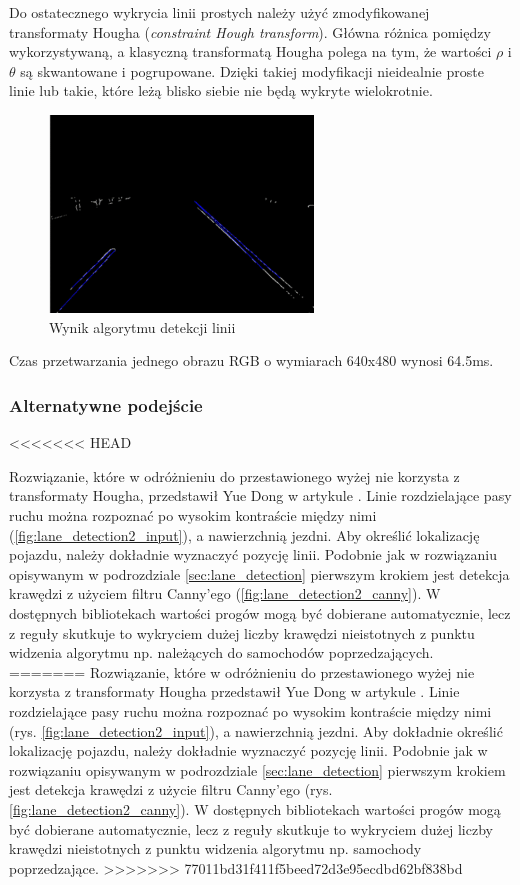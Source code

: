 Do ostatecznego wykrycia linii prostych należy użyć zmodyfikowanej transformaty Hougha (\textit{constraint Hough transform}). 
Główna różnica pomiędzy wykorzystywaną, a klasyczną transformatą Hougha polega na tym, że wartości $\rho$ i $\theta$ są skwantowane i pogrupowane. 
Dzięki takiej modyfikacji nieidealnie proste linie lub takie, które leżą blisko siebie nie będą wykryte wielokrotnie. 

\begin{figure}
  \centering
  \includegraphics[width=7cm]{img/prehough.png}
  \caption{Wynik algorytmu detekcji linii\cite{T3}}
  \label{fig:result}
\end{figure}

Czas przetwarzania jednego obrazu RGB o wymiarach 640x480 wynosi 64.5ms.

\subsubsection{Alternatywne podejście}
<<<<<<< HEAD

Rozwiązanie, które w odróżnieniu do przestawionego wyżej nie korzysta z transformaty Hougha, przedstawił Yue Dong w artykule \cite{T6}.
Linie rozdzielające pasy ruchu można rozpoznać po wysokim kontraście między nimi (\ref{fig:lane_detection2_input}), a nawierzchnią jezdni. 
Aby określić lokalizację pojazdu, należy dokładnie wyznaczyć pozycję linii. 
Podobnie jak w rozwiązaniu opisywanym w podrozdziale \ref{sec:lane_detection} pierwszym krokiem jest detekcja krawędzi z użyciem filtru Canny'ego (\ref{fig:lane_detection2_canny}). 
W dostępnych bibliotekach wartości progów mogą być dobierane automatycznie, lecz z reguły skutkuje to wykryciem dużej liczby krawędzi nieistotnych z punktu widzenia algorytmu np. należących do samochodów poprzedzających.
=======
Rozwiązanie, które w odróżnieniu do przestawionego wyżej nie korzysta z transformaty Hougha przedstawił Yue Dong w artykule \cite{T6}.
Linie rozdzielające pasy ruchu można rozpoznać po wysokim kontraście między nimi (rys. \ref{fig:lane_detection2_input}), a nawierzchnią jezdni. Aby dokładnie określić lokalizację pojazdu, należy dokładnie wyznaczyć pozycję linii. 
Podobnie jak w rozwiązaniu opisywanym w podrozdziale \ref{sec:lane_detection} pierwszym krokiem jest detekcja krawędzi z użycie filtru Canny'ego (rys. \ref{fig:lane_detection2_canny}). W dostępnych bibliotekach wartości progów mogą być dobierane automatycznie, lecz z reguły skutkuje to wykryciem dużej liczby krawędzi nieistotnych z punktu widzenia algorytmu np. samochody poprzedzające.
>>>>>>> 77011bd31f411f5beed72d3e95ecdbd62bf838bd

